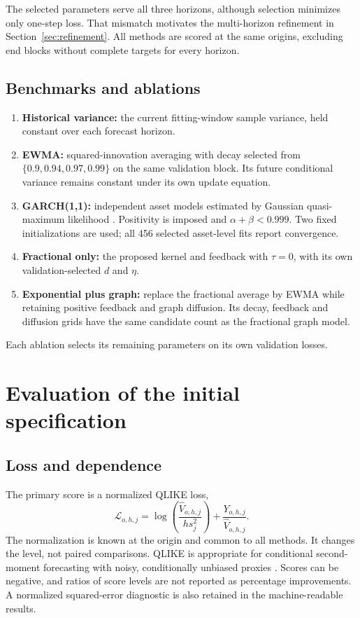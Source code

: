 \documentclass[12pt,a4paper]{article}
\begin{document}
The selected parameters serve all three horizons, although selection minimizes
only one-step loss. That mismatch motivates the multi-horizon refinement in
Section~\ref{sec:refinement}. All methods are scored at the same origins,
excluding end blocks without complete targets for every horizon.

\subsection{Benchmarks and ablations}
\begin{enumerate}[leftmargin=*,itemsep=0.2em]
\item \textbf{Historical variance:} the current fitting-window sample variance,
held constant over each forecast horizon.
\item \textbf{EWMA:} squared-innovation averaging with decay selected from
$\{0.9,0.94,0.97,0.99\}$ on the same validation block. Its future conditional
variance remains constant under its own update equation.
\item \textbf{GARCH(1,1):} independent asset models estimated by Gaussian
quasi-maximum likelihood \citep{bollerslev1986}. Positivity is imposed and
$\alpha+\beta<0.999$. Two fixed initializations are used; all 456 selected
asset-level fits report convergence.
\item \textbf{Fractional only:} the proposed kernel and feedback with $\tau=0$,
with its own validation-selected $d$ and $\eta$.
\item \textbf{Exponential plus graph:} replace the fractional average by EWMA
while retaining positive feedback and graph diffusion. Its decay, feedback and
diffusion grids have the same candidate count as the fractional graph model.
\end{enumerate}

Each ablation selects its remaining parameters on its own validation losses.

\section{Evaluation of the initial specification}
\subsection{Loss and dependence}
The primary score is a normalized QLIKE loss,
\begin{equation}
\mathcal L_{o,h,j}=\log\left(\frac{\widehat V_{o,h,j}}{h s_j^2}\right)
+\frac{Y_{o,h,j}}{\widehat V_{o,h,j}}.
\label{eq:qlike}
\end{equation}
The normalization is known at the origin and common to all methods. It changes
the level, not paired comparisons. QLIKE is appropriate for conditional
second-moment forecasting with noisy, conditionally unbiased proxies
\citep{patton2011,patton2009}. Scores can be negative, and ratios of score levels are not reported as
percentage improvements. A normalized squared-error diagnostic is also retained
in the machine-readable results.
\end{document}
